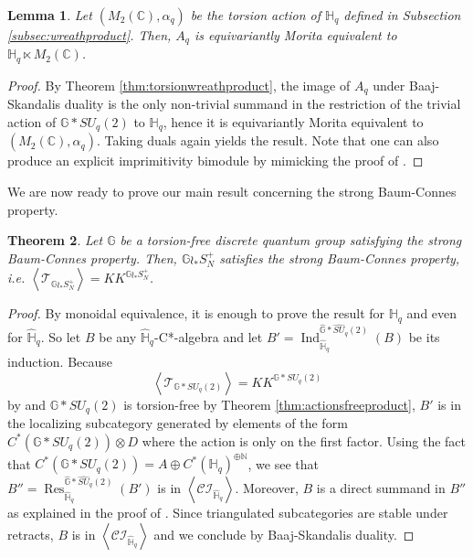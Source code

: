 \documentclass[a4paper, 11pt]{amsart}
\theoremstyle{plain}
\newtheorem{thm}{Theorem}[section]
\newtheorem{lem}[thm]{Lemma}
\theoremstyle{definition}
\theoremstyle{remark}
\DeclareMathOperator{\Ind}{Ind}
\DeclareMathOperator{\Res}{Res}
\newcommand{\C}{\mathbb{C}}
\newcommand{\CI}{\mathcal{CI}}
\newcommand{\G}{\mathbb{G}}
\newcommand{\HH}{\mathbb{H}}
\newcommand{\N}{\mathbb{N}}
\newcommand{\T}{\mathcal{T}}
\begin{document}
\begin{lem}\label{lem:canonicaltorsion}
Let $(M_{2}(\C), \alpha_{q})$ be the torsion action of $\HH_{q}$ defined in Subsection \ref{subsec:wreathproduct}. Then, $A_{q}$ is equivariantly Morita equivalent to $\HH_{q}\ltimes M_{2}(\C)$.
\end{lem}

\begin{proof}
By Theorem \ref{thm:torsionwreathproduct}, the image of $A_{q}$ under Baaj-Skandalis duality is the only non-trivial summand in the restriction of the trivial action of $\G\ast SU_{q}(2)$ to $\HH_{q}$, hence it is equivariantly Morita equivalent to $(M_{2}(\C), \alpha_{q})$. Taking duals again yields the result. Note that one can also produce an explicit imprimitivity bimodule by mimicking the proof of \cite[Lem 5.1]{voigt2015structure}.
\end{proof}

We are now ready to prove our main result concerning the strong Baum-Connes property.

\begin{thm}\label{thm:baumconnestorsionfree}
Let $\G$ be a torsion-free discrete quantum group satisfying the strong Baum-Connes property. Then, $\G\wr_{\ast}S_{N}^{+}$ satisfies the strong Baum-Connes property, i.e. $\left\langle\T_{\G\wr_{\ast}S_{N}^{+}}\right\rangle = KK^{\G\wr_{\ast}S_{N}^{+}}$.
\end{thm}

\begin{proof}
By monoidal equivalence, it is enough to prove the result for $\HH_{q}$ and even for $\widehat{\HH}_{q}$. So let $B$ be any $\widehat{\HH}_{q}$-C*-algebra and let $B' = \Ind_{\widehat{\HH}_{q}}^{\widehat{\G}\ast \widehat{SU}_{q}(2)}(B)$ be its induction. Because
\begin{equation*}
\left\langle\T_{\G\ast SU_{q}(2)}\right\rangle = KK^{\G\ast SU_{q}(2)}
\end{equation*}
by \cite{vergnioux2013k}
and $\G\ast SU_{q}(2)$ is torsion-free by Theorem \ref{thm:actionsfreeproduct}, $B'$ is in the localizing subcategory generated by elements of the form $C^{*}(\G\ast SU_{q}(2))\otimes D$ where the action is only on the first factor. Using the fact that $C^{*}(\G\ast SU_{q}(2)) = A\oplus C^{*}(\HH_{q})^{\oplus \N}$, we see that $B'' = \Res^{\widehat{\G}\ast \widehat{SU}_{q}(2)}_{\widehat{\HH}_{q}}(B')$ is in $\left\langle\CI_{\widehat{\HH}_{q}}\right\rangle$. Moreover, $B$ is a direct summand in $B''$ as explained in the proof of \cite[Thm 5.2]{voigt2015structure}. Since triangulated subcategories are stable under retracts, $B$ is in $\left\langle\CI_{\widehat{\HH}_{q}}\right\rangle$ and we conclude by Baaj-Skandalis duality.
\end{proof}
\end{document}
